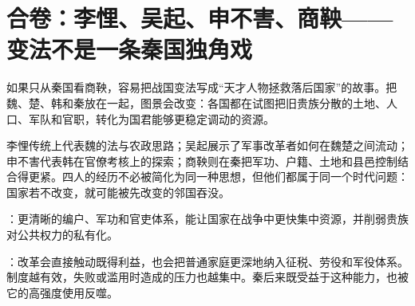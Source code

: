\section{合卷：李悝、吴起、申不害、商鞅——变法不是一条秦国独角戏}

如果只从秦国看商鞅，容易把战国变法写成“天才人物拯救落后国家”的故事。把魏、楚、韩和秦放在一起，图景会改变：各国都在试图把旧贵族分散的土地、人口、军队和官职，转化为国君能够更稳定调动的资源。

李悝传统上代表魏的法与农政思路；吴起展示了军事改革者如何在魏楚之间流动；申不害代表韩在官僚考核上的探索；商鞅则在秦把军功、户籍、土地和县邑控制结合得更紧。四人的经历不必被简化为同一种思想，但他们都属于同一个时代问题：国家若不改变，就可能被先改变的邻国吞没。

\begin{turningpoint}
：更清晰的编户、军功和官吏体系，能让国家在战争中更快集中资源，并削弱贵族对公共权力的私有化。

：改革会直接触动既得利益，也会把普通家庭更深地纳入征税、劳役和军役体系。制度越有效，失败或滥用时造成的压力也越集中。秦后来既受益于这种能力，也被它的高强度使用反噬。
\end{turningpoint}

